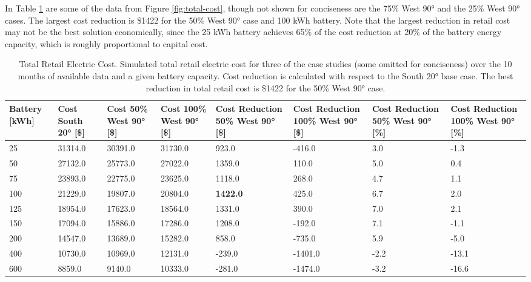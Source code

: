 \documentclass[
]{article}
\begin{document}
In Table \ref{tab:total-cost} are some of the data from Figure \ref{fig:total-cost}, though not shown for
conciseness are the 75\% West 90° and the 25\% West 90° cases. The
largest cost reduction is \$1422 for the 50\% West 90° case and 100 kWh
battery. Note that the largest reduction in retail cost may not be the
best solution economically, since the 25 kWh battery achieves 65\% of
the cost reduction at 20\% of the battery energy capacity, which is
roughly proportional to capital cost.

\begin{table}[!h]
  \centering
  \caption{Total Retail Electric Cost. Simulated total
  retail electric cost for three of the case studies (some omitted for
  conciseness) over the 10 months of available data and a given battery
  capacity. Cost reduction is calculated with respect to the South 20°
  base case. The best reduction in total retail cost is \$1422 for the
  50\% West 90° case.}
  \label{tab:total-cost}
  \begin{tabularx}{\textwidth}{XXXXXXXX}
  \toprule
  Battery {[}kWh{]} & Cost South 20° {[}\${]}                & Cost 50\% West 90°
  {[}\${]}          & Cost 100\% West 90° {[}\${]}           & Cost Reduction 50\% West 90°
  {[}\${]}          & Cost Reduction 100\% West 90° {[}\${]} & Cost Reduction 50\%
  West 90° {[}\%{]} & Cost Reduction 100\% West 90°
  {[}\%{]}\\
  \midrule
  25                & 31314.0                                & 30391.0                      & 31730.0 & 923.0           & -416.0  & 3.0  & -1.3\\
  50                & 27132.0                                & 25773.0                      & 27022.0 & 1359.0          & 110.0   & 5.0  & 0.4\\
  75                & 23893.0                                & 22775.0                      & 23625.0 & 1118.0          & 268.0   & 4.7  & 1.1\\
  100               & 21229.0                                & 19807.0                      & 20804.0 & \textbf{1422.0} & 425.0   & 6.7  & 2.0\\
  125               & 18954.0                                & 17623.0                      & 18564.0 & 1331.0          & 390.0   & 7.0  & 2.1\\
  150               & 17094.0                                & 15886.0                      & 17286.0 & 1208.0          & -192.0  & 7.1  & -1.1\\
  200               & 14547.0                                & 13689.0                      & 15282.0 & 858.0           & -735.0  & 5.9  & -5.0\\
  400               & 10730.0                                & 10969.0                      & 12131.0 & -239.0          & -1401.0 & -2.2 & -13.1\\
  600               & 8859.0                                 & 9140.0                       & 10333.0 & -281.0          & -1474.0 & -3.2 & -16.6\\
  \bottomrule
  \end{tabularx}
\end{table}
\end{document}
